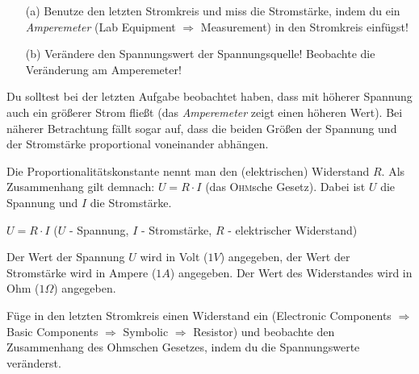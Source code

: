 \begin{Aufgabe}
\hfill \par \vspace*{-.8cm}
\begin{itemize}
\item[(a)] Benutze den letzten Stromkreis und miss die Stromstärke, indem du ein \emph{Amperemeter} (Lab Equipment $\Rightarrow$ Measurement) in den Stromkreis einfügst!
\item[(b)] Verändere den Spannungswert der Spannungsquelle! Beobachte die Veränderung am Amperemeter!
\end{itemize}
\end{Aufgabe}


Du solltest bei der letzten Aufgabe beobachtet haben, dass mit höherer Spannung auch ein größerer Strom fließt (das \emph{Amperemeter} zeigt einen höheren Wert).
Bei näherer Betrachtung fällt sogar auf, dass die beiden Größen der Spannung und der Stromstärke proportional voneinander abhängen.

Die Proportionalitätskonstante nennt man den (elektrischen) Widerstand $R$.
Als Zusammenhang gilt demnach: $U = R \cdot I$ (das \textsc{Ohm}sche Gesetz).
Dabei ist $U$ die Spannung und $I$ die Stromstärke.

\begin{sich}
$U = R \cdot I$ ($U$ - Spannung, $I$ - Stromstärke, $R$ - elektrischer Widerstand)

Der Wert der Spannung $U$ wird in Volt ($1V$) angegeben, der Wert der Stromstärke wird in Ampere ($1A$) angegeben. Der Wert des Widerstandes wird in Ohm ($1\Omega$) angegeben.
\end{sich}




\begin{Aufgabe}
Füge in den letzten Stromkreis einen Widerstand ein (Electronic Components $\Rightarrow$ Basic Components $\Rightarrow$ Symbolic $\Rightarrow$ Resistor) und beobachte den Zusammenhang des Ohmschen Gesetzes, indem du die Spannungswerte veränderst.
\end{Aufgabe}


